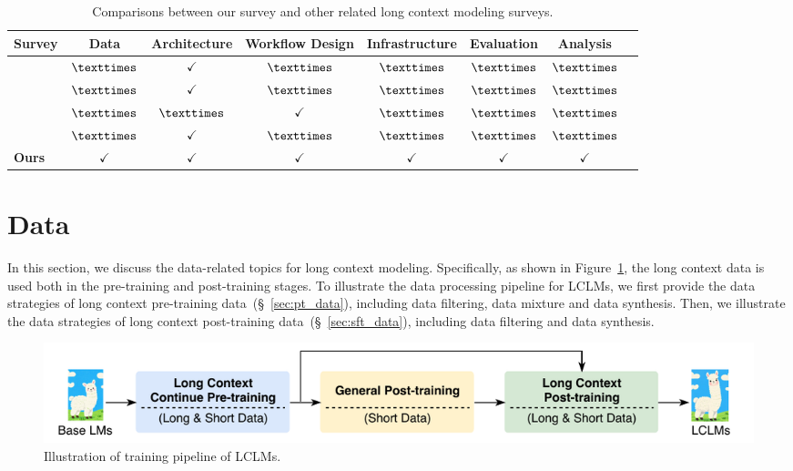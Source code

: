 \documentclass[11pt, a4paper, logo, copyright, nonumbering]{map}
\begin{document}
\begin{table}[t]
    \centering
    \footnotesize
    \renewcommand{\arraystretch}{1.2}
        \setlength\tabcolsep{3.5pt}

    \resizebox{\textwidth}{!}
    {
    \begin{tabular}{lccccccc}
    \toprule
    \textbf{Survey} & \textbf{Data} & \textbf{Architecture} & \textbf{Workflow Design} & \textbf{Infrastructure} & \textbf{Evaluation} & \textbf{Analysis}  \\
    \midrule
    \citet{huang2024advancing}&$\texttimes$ & $\checkmark $ &  $\texttimes$  &  $\texttimes$ & $\texttimes $ & $\texttimes $ \\
    \citet{zhao-etal-2024-length}& $\texttimes$ & $\checkmark $ &  $\texttimes$  &  $\texttimes$ & $\texttimes $ & $\texttimes $ \\
    \citet{Li2024PromptCF} & $\texttimes$ & $\texttimes $ &  $\checkmark$  &  $\texttimes$ & $\texttimes $ & $\texttimes $ \\
    \citet{DBLP:journals/corr/abs-2302-14502}& $\texttimes$ & $\checkmark $ &  $\texttimes$  &  $\texttimes$ & $\texttimes $ & $\texttimes $ \\
    \textbf{Ours} &$\checkmark$ & $\checkmark$ &  $\checkmark$ &  $\checkmark$ & $\checkmark$ & $\checkmark$  \\ 
    \bottomrule
    \end{tabular}
    }
    \caption{Comparisons between our survey and other related long context modeling surveys.}
    \label{tab: benchmark_compare}
\end{table}


\section{Data} 
\label{sec:data}


In this section, we discuss the data-related topics for long context modeling. Specifically, 
as shown in Figure~\ref{fig:data_arg},
the long context data is used both in the pre-training and post-training stages.
To illustrate the data processing pipeline for LCLMs,
we first provide the data strategies of long context pre-training data~(\S~\ref{sec:pt_data}), including data filtering, data mixture and data synthesis.
Then, we illustrate the data strategies of long context post-training data~(\S~\ref{sec:sft_data}), including data filtering and data synthesis.
\begin{figure}[!htp]
    \centering
    \includegraphics[width=1.0\textwidth]{graphs/data.pdf}
    \caption{Illustration of training pipeline of LCLMs.}
    \label{fig:data_arg}
\end{figure}
\end{document}
